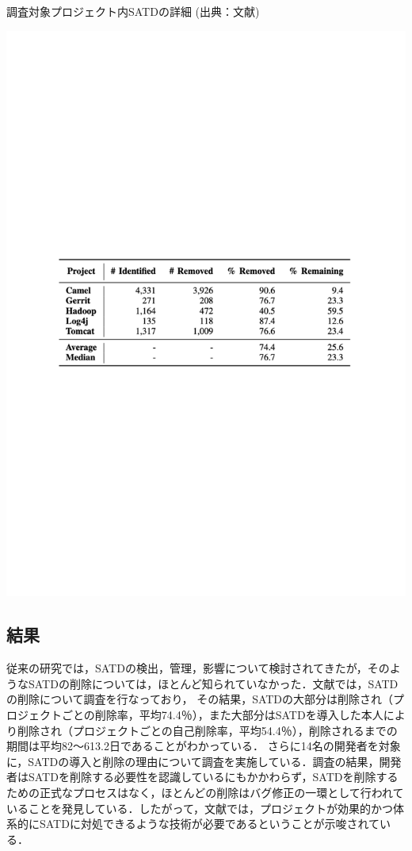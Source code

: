 \begin{table}[t]
    \centering
    \caption{調査対象プロジェクト内SATDの詳細 (出典：文献\cite{satd-removal})}
    \includegraphics[width=0.9\linewidth, angle=0]{./thesis1/data-satd-table1.pdf}
    \label{fig:1_data-satd-table}
\end{table}



\subsection{結果}
従来の研究では，SATDの検出，管理，影響について検討されてきたが，そのようなSATDの削除については，ほとんど知られていなかった．文献\cite{satd-removal}では，SATDの削除について調査を行なっており，
その結果，SATDの大部分は削除され（プロジェクトごとの削除率，平均74.4％），また大部分はSATDを導入した本人により削除され（プロジェクトごとの自己削除率，平均54.4％），削除されるまでの期間は平均82～613.2日であることがわかっている．
さらに14名の開発者を対象に，SATDの導入と削除の理由について調査を実施している．調査の結果，開発者はSATDを削除する必要性を認識しているにもかかわらず，SATDを削除するための正式なプロセスはなく，ほとんどの削除はバグ修正の一環として行われていることを発見している．したがって，文献\cite{satd-removal}では，プロジェクトが効果的かつ体系的にSATDに対処できるような技術が必要であるということが示唆されている．



